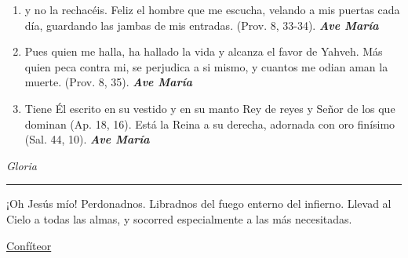 \documentclass[a4paper,11pt, oneside]{report}
\begin{document}
{{\begin{enumerate}
        \item y no la rechacéis. Feliz el hombre que me escucha, velando a mis puertas cada día, guardando las jambas de mis entradas. 
        (Prov. 8, 33-34). \textbf{\textit{Ave María}}

        \item Pues quien me halla, ha hallado la vida y alcanza el favor de Yahveh. Más quien peca contra mi, se perjudica a si mismo,
        y cuantos me odian aman la muerte. (Prov. 8, 35). \textbf{\textit{Ave María}}

        \item Tiene Él escrito en su vestido y en su manto Rey de reyes y Señor de los que dominan (Ap. 18, 16).
        Está la Reina a su derecha, adornada con oro finísimo (Sal. 44, 10). \textbf{\textit{Ave María}}
      \end{enumerate}      

      \indent\textit{Gloria} \par      

      \begin{center}\rule{1\linewidth}{\linethickness}\end{center}      

      \medskip
      \hypertarget{finalCoronacion}{¡Oh Jesús mío! Perdonadnos. Libradnos del fuego enterno del infierno. Llevad al Cielo a todas las almas, y socorred especialmente a las más 
      necesitadas.}
    }

  \par\bigskip
  \hyperlink{sec:confiteor}{Confíteor}
}
\end{document}
